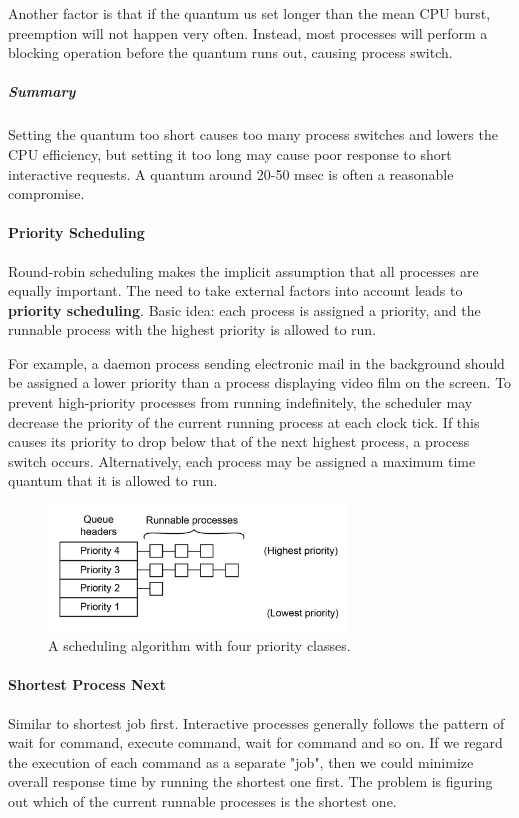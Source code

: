 \documentclass[11pt,a4paper]{article}
\begin{document}
Another factor is that if the quantum us set longer than the mean CPU burst, preemption will not happen very often. Instead, most processes will perform a blocking operation before the quantum runs out, causing process switch.

\subparagraph{Summary} 
Setting the quantum too short causes too many process switches and lowers the CPU efficiency, but setting it too long may cause poor response to short interactive requests. A quantum around 20-50 msec is often a reasonable compromise.

\paragraph{Priority Scheduling}
Round-robin scheduling makes the implicit assumption that all processes are equally important. The need to take external factors into account leads to \textbf{priority scheduling}. Basic idea: each process is assigned a priority, and the runnable process with the highest priority is allowed to run. 

For example, a daemon process sending electronic mail in the background should be assigned a lower priority than a process displaying video film on the screen. To prevent high-priority processes from running indefinitely, the scheduler may decrease the priority of the current running process at each clock tick. If this causes its priority to drop below that of the next highest process, a process switch occurs. Alternatively, each process may be assigned a maximum time quantum that it is allowed to run.

\begin{figure}[h!]
	\centering
		\includegraphics[width=300px]{img/pri-01.png}
	\caption{A scheduling algorithm with four priority classes.}
\end{figure}

\paragraph{Shortest Process Next}
Similar to shortest job first. Interactive processes generally follows the pattern of wait for command, execute command, wait for command and so on. If we regard the execution of each command as a separate "job", then we could minimize overall response time by running the shortest one first. The problem is figuring out which of the current runnable processes is the shortest one. 
\end{document}
